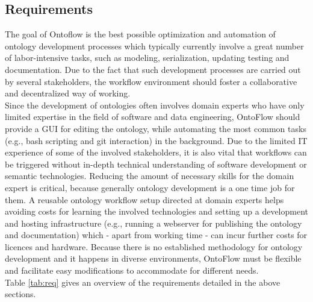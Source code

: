 \documentclass[sigconf]{acmart}
\begin{document}
\subsection{Requirements}
The goal of Ontoflow is the best possible optimization and automation of ontology development processes which typically currently involve a great number of labor-intensive tasks, such as modeling, serialization, updating testing and documentation. Due to the fact that such development processes are carried out by several stakeholders, the workflow environment should foster a collaborative and decentralized way of working.\\
Since the development of ontologies often involves domain experts who have only limited expertise in the field of software and data engineering, OntoFlow should provide a GUI for editing the ontology, while automating the most common tasks (e.g., bash scripting and git interaction) in the background. Due to the limited IT experience of some of the involved stakeholders, it is also vital that workflows can be triggered without in-depth technical understanding of software development or semantic technologies. Reducing the amount of necessary skills for the domain expert is critical, because generally ontology development is a one time job for them. A reusable ontology workflow setup directed at domain experts helps avoiding costs for learning the involved technologies and setting up a development and hosting infrastructure (e.g., running a webserver for publishing the ontology and documentation) which - apart from working time - can incur further costs for licences and hardware. Because there is no established methodology for ontology development and it happens in diverse environments, OntoFlow must be flexible and facilitate easy modifications to accommodate for different needs.\\
Table \ref{tab:req} gives an overview of the requirements detailed in the above sections.
\end{document}

